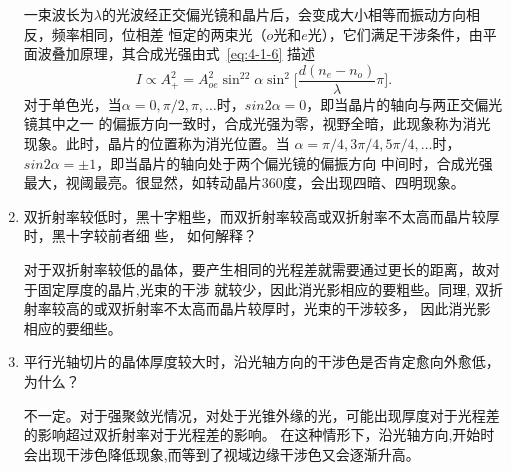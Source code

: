 \documentclass[11pt,a4paper]{article}
\begin{document}
\begin{spacing}{1.3}
\begin{CJK*}{UTF8}{gbsn}
\begin{enumerate}
一束波长为$\lambda$的光波经正交偏光镜和晶片后，会变成大小相等而振动方向相反，频率相同，位相差
恒定的两束光（$o$光和$e$光），它们满足干涉条件，由平面波叠加原理，其合成光强由式~\eqref{eq:4-1-6}
描述
\begin{equation}
I\propto A_+^2= A_{oe}^2\sin^22\alpha\sin^2\big[\frac{d(n_e-n_o)}{\lambda}\pi\big].
\end{equation}
对于单色光，当$\alpha=0,\pi/2,\pi,\ldots$时，$sin2\alpha=0$，即当晶片的轴向与两正交偏光镜其中之一
的偏振方向一致时，合成光强为零，视野全暗，此现象称为消光现象。此时，晶片的位置称为消光位置。当
$\alpha=\pi/4,3\pi/4,5\pi/4,\ldots$时，$sin2\alpha=\pm 1$，即当晶片的轴向处于两个偏光镜的偏振方向
中间时，合成光强最大，视阈最亮。很显然，如转动晶片$360$度，会出现四暗、四明现象。\par
\item 双折射率较低时，黑十字粗些，而双折射率较高或双折射率不太高而晶片较厚时，黑十字较前者细
些， 如何解释？\par 
对于双折射率较低的晶体，要产生相同的光程差就需要通过更长的距离，故对于固定厚度的晶片,光束的干涉
就较少，因此消光影相应的要粗些。同理, 双折射率较高的或双折射率不太高而晶片较厚时，光束的干涉较多，
因此消光影相应的要细些。
\item 平行光轴切片的晶体厚度较大时，沿光轴方向的干涉色是否肯定愈向外愈低，为什么？\par 
不一定。对于强聚敛光情况，对处于光锥外缘的光，可能出现厚度对于光程差的影响超过双折射率对于光程差的影响。
在这种情形下，沿光轴方向,开始时会出现干涉色降低现象,而等到了视域边缘干涉色又会逐渐升高。
\end{enumerate}





\end{CJK*}
\end{spacing}
\end{document}
